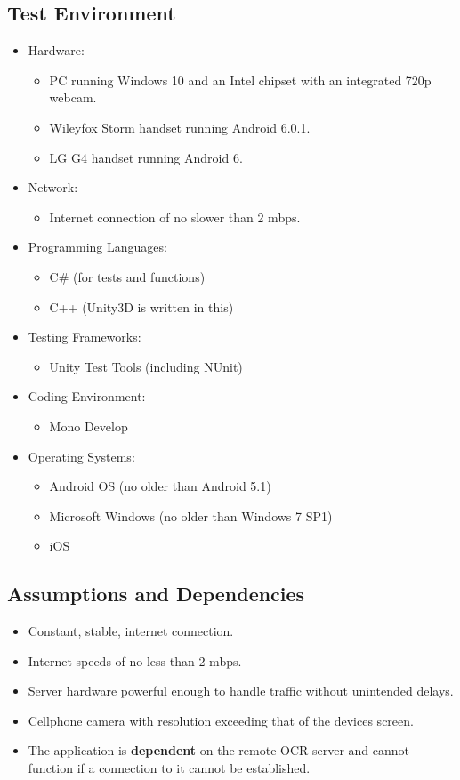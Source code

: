 \documentclass[a4paper,12pt]{article}
\begin{document}
\subsection{Test Environment}
\begin{itemize}
\item Hardware:
	\begin{itemize}
		\item PC running Windows 10 and an Intel chipset with an integrated 720p webcam.
		\item Wileyfox Storm handset running Android 6.0.1.
		\item LG G4 handset running Android 6.
	\end{itemize}
\item Network:
	\begin{itemize}
		\item Internet connection of no slower than 2 mbps.
	\end{itemize}
\item Programming Languages: 
	\begin{itemize}
		\item C\# (for tests and functions)
		\item C++ (Unity3D is written in this)
	\end{itemize}
\item Testing Frameworks:
	\begin{itemize}
		\item  Unity Test Tools (including NUnit)
	\end{itemize}
\item Coding Environment:
	\begin{itemize}
		\item Mono Develop
	\end{itemize}
\item Operating Systems:
	\begin{itemize}
		\item Android OS (no older than Android 5.1)
		\item Microsoft Windows (no older than Windows 7 SP1)
		\item iOS
	\end{itemize}
\end{itemize}

\subsection{Assumptions and Dependencies}
\begin{itemize}
	\item Constant, stable, internet connection.
	\item Internet speeds of no less than 2 mbps.
	\item Server hardware powerful enough to handle traffic without unintended delays.
	\item Cellphone camera with resolution exceeding that of the devices screen.
	\item The application is \textbf{dependent} on the remote OCR server and cannot function if a connection to it cannot be established.
\end{itemize}
\end{document}

